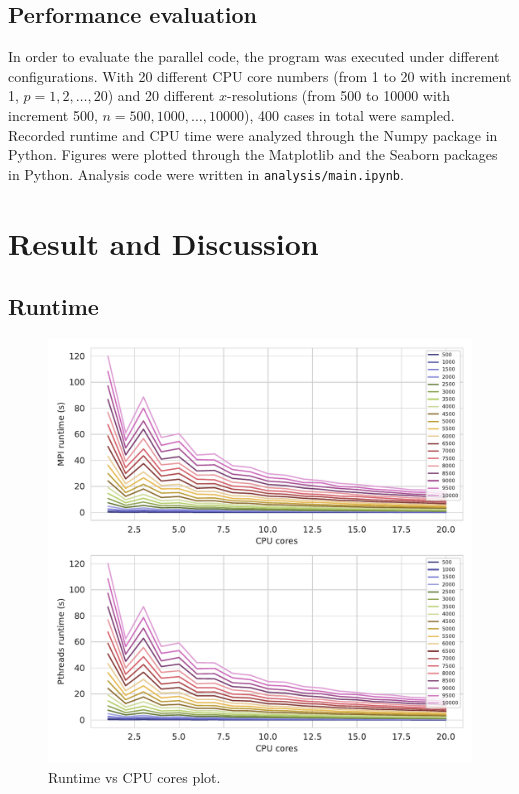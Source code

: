 \documentclass[twoside,12pt]{article}
\theoremstyle{definition}
\theoremstyle{remark}
\begin{document}
\subsection{Performance evaluation}
In order to evaluate the parallel code, the program was executed under 
different configurations.
With 20 different CPU core numbers (from 1 to 20 with increment 1, $p=1, 2,\dots, 20$)
and 20 different $x$-resolutions 
(from 500 to 10000 with increment 500, $n=500, 1000, \dots, 10000$), 
400 cases in total were sampled.
Recorded runtime and CPU time were analyzed through the Numpy
package in Python.
Figures were plotted through the Matplotlib and the Seaborn packages in Python.
Analysis code were written in \lstinline|analysis/main.ipynb|.

\newpage
\section{Result and Discussion}
\subsection{Runtime}
\begin{figure}[t!]
    \centering
    \includegraphics[width=\textwidth]{../analysis/runtime-core.pdf}
    \caption{Runtime vs CPU cores plot.}
    \label{fig:runtime-core}
\end{figure}
\end{document}
